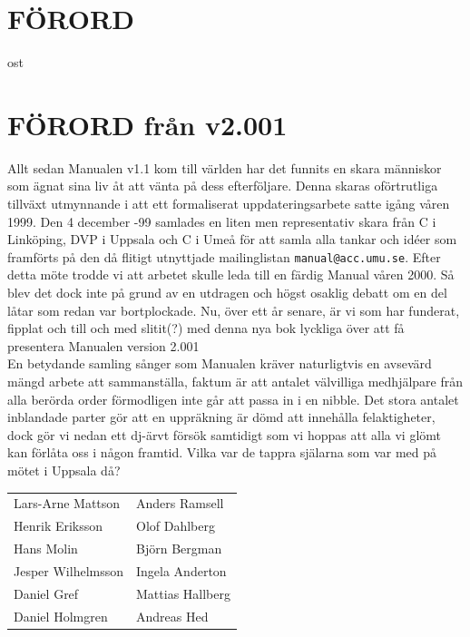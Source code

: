 \documentclass[a6paper,fontsize=10pt,twoside,open=right]{scrbook}
\begin{document}
\section{FÖRORD}\vspace{10pt}
\hspace{10pt} ost
\cleardoublepage
\section{FÖRORD från v2.001}\par
\vspace{10pt}
\hspace{10pt}Allt sedan Manualen v1.1 kom till världen har det
funnits en skara människor som ägnat sina liv åt att vänta på dess
efterföljare. Denna skaras oförtrutliga tillväxt utmynnande i att ett
formaliserat uppdateringsarbete satte igång våren 1999. Den 4 december
-99 samlades en liten men representativ skara från C i Linköping, DVP
i Uppsala och C i Umeå för att samla alla tankar och idéer som
framförts på den då flitigt utnyttjade mailinglistan
\texttt{manual@acc.umu.se}. Efter detta möte trodde vi att arbetet
skulle leda till en färdig Manual våren 2000. Så blev det dock inte på
grund av en utdragen och högst osaklig debatt om en del låtar som
redan var bortplockade. Nu, över ett år senare, är vi som har
funderat, fipplat och till och med slitit(?) med denna nya bok
lyckliga över att få presentera Manualen version 2.001\\ \indent En
betydande samling sånger som Manualen kräver naturligtvis en avsevärd
mängd arbete att sammanställa, faktum är att antalet välvilliga
medhjälpare från alla berörda order förmodligen inte går att passa in
i en nibble. Det stora antalet inblandade parter gör att en uppräkning
är dömd att innehålla felaktigheter, dock gör vi nedan ett dj-ärvt
försök samtidigt som vi hoppas att alla vi glömt kan förlåta oss i
någon framtid.
\newpage
\indent Vilka var de tappra själarna som var med på mötet i Uppsala
då?\par
\vspace{10pt}
\noindent
\begin{tabular}{@{}p{}p{}@{}}
  Lars-Arne Mattson & Anders Ramsell\\
  Henrik Eriksson & Olof Dahlberg\\
  Hans Molin & Björn Bergman\\
  Jesper Wilhelmsson & Ingela Anderton\\
  Daniel Gref & Mattias Hallberg\\
  Daniel Holmgren & Andreas Hed
\end{tabular}\par
\end{document}
